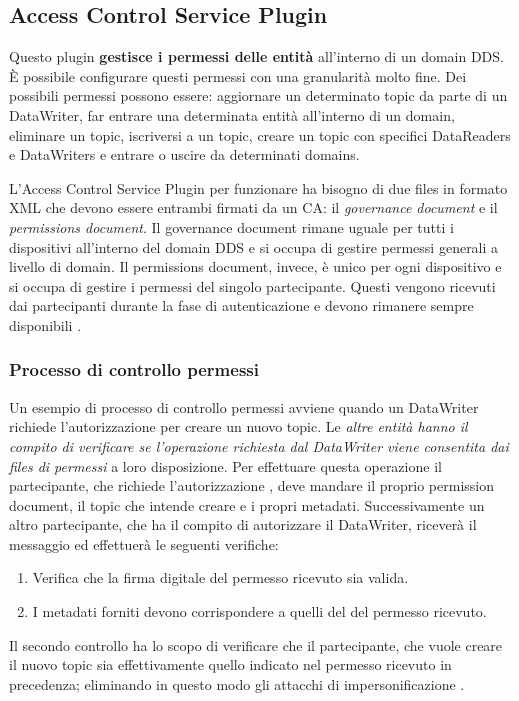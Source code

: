 \subsection{Access Control Service Plugin}

Questo plugin \textbf{gestisce i permessi delle entità} all'interno di 
un domain DDS. È possibile configurare questi permessi con una 
granularità molto fine. Dei possibili permessi possono essere:
aggiornare un determinato topic da parte di 
un DataWriter, far entrare una determinata entità
all'interno di un domain, eliminare un topic, iscriversi a un topic, 
creare un topic con specifici DataReaders e DataWriters e
entrare o uscire da determinati domains.

L'Access Control Service Plugin per funzionare ha bisogno di due 
files in formato XML che devono essere entrambi firmati da 
un CA: il \textit{governance document} e il \textit{permissions document}.
Il governance document rimane uguale per tutti i dispositivi 
all'interno del domain DDS e si occupa di gestire 
permessi generali a livello di domain. Il permissions document,
invece, è unico per ogni dispositivo e si occupa di gestire i 
permessi del singolo partecipante.
Questi vengono ricevuti dai partecipanti durante la fase di
autenticazione e devono rimanere sempre disponibili \cite{essay93639}.

\subsubsection{Processo di controllo permessi}
Un esempio di processo di controllo permessi avviene
quando un DataWriter richiede l'autorizzazione per creare un nuovo topic.
Le \textit{altre entità hanno il compito di verificare se l'operazione 
richiesta dal DataWriter viene consentita
dai files di permessi} a loro disposizione. Per effettuare 
questa operazione il partecipante, che richiede l'autorizzazione ,
deve mandare il proprio permission document, il topic che intende creare e 
i propri metadati. Successivamente un altro partecipante,
che ha il compito di autorizzare il DataWriter,
riceverà il messaggio ed effettuerà le seguenti
verifiche:
\begin{enumerate}
    \item Verifica che la firma digitale del permesso ricevuto sia valida.
    \item I metadati forniti devono corrispondere a quelli del del 
    permesso ricevuto.
\end{enumerate}
Il secondo controllo ha lo scopo di verificare
che il partecipante, che vuole creare il 
nuovo topic sia effettivamente quello indicato nel permesso 
ricevuto in precedenza; eliminando in questo modo gli attacchi di 
impersonificazione 
\cite{DBLP:conf/asiaccs/WangLG24}.

